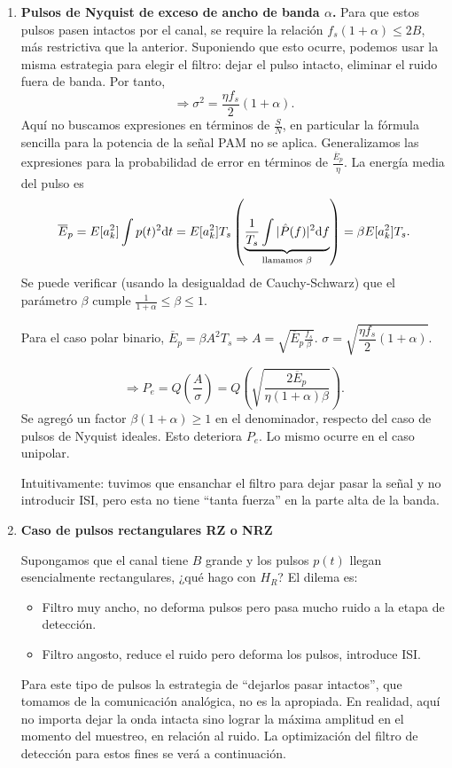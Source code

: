 \begin{enumerate}
\newpage


    \item \textbf{Pulsos de Nyquist de exceso de ancho de banda $\alpha$.}
    \label{item:2}
    Para que estos pulsos pasen intactos por el canal, se require
    la relación $f_s (1+\alpha) \leq 2B$, más restrictiva que la
    anterior. Suponiendo que esto ocurre, podemos usar la misma
    estrategia para elegir el filtro: dejar el pulso intacto,
    eliminar el ruido fuera de banda. Por tanto,
 \[
\Rightarrow \sigma^2 = \frac{\eta f_s}{2}(1+\alpha).
\]
Aquí no buscamos expresiones en términos de $\frac{S}{N}$, en
particular la fórmula sencilla para la potencia de la señal PAM
no se aplica. Generalizamos las expresiones para la probabilidad
de error en términos de $\frac{\overline{E}_p}{\eta}$. La energía
media del pulso es
    \[\overline{E}_p = E[a_k^2] \int p(t)^2\mathrm{d} t = E[a_k^2] T_s \left(\underbrace{\frac{1}{T_s}\int |\hat{P}(f)|^2\mathrm{d} f}_{\text{llamamos }\beta}\right)
     = \beta E[a_k^2] T_s.\]
    Se puede verificar (usando la desigualdad de Cauchy-Schwarz) que el parámetro $\beta$ cumple  $\frac{1}{1+\alpha} \leq \beta \leq
    1$.

    Para el caso polar binario, $\overline{E}_p = \beta A^2 T_s\Rightarrow A=\sqrt{\overline{E}_p \frac{f_s}{\beta}}$. $\sigma=\sqrt{\dfrac{\eta f_s}{2} (1+\alpha)}$.

    \[\Rightarrow P_e = Q\left(\frac{A}{\sigma}\right) = Q\left(\sqrt{\frac{2\overline{E}_p}{\eta (1+\alpha)\beta}}\right).\]
    Se agregó un factor $\beta(1+\alpha)\geq 1$ en el denominador,
    respecto del caso de pulsos de Nyquist ideales. Esto deteriora
    $P_e$. Lo mismo ocurre en el caso unipolar.

    Intuitivamente: tuvimos que ensanchar el filtro para dejar pasar la señal y no introducir ISI, pero esta no tiene ``tanta fuerza'' en la parte alta de la banda.

    \item \textbf{Caso de pulsos rectangulares RZ o NRZ}
    \label{item:3}

    Supongamos que el canal tiene $B$ grande y los pulsos $p(t)$ llegan esencialmente rectangulares, ¿qué hago con $H_R$? El dilema es:
    \begin{itemize}
        \item Filtro muy ancho, no deforma pulsos pero pasa mucho ruido a la etapa de
        detección.
        \item Filtro angosto, reduce el ruido pero deforma los pulsos, introduce ISI.
    \end{itemize}
    Para este tipo de pulsos la estrategia de ``dejarlos pasar intactos'', que tomamos de la comunicación analógica, no
    es la apropiada.
    En realidad, aquí no importa dejar la onda intacta sino lograr la máxima amplitud en el momento del
    muestreo, en relación al ruido. La optimización del filtro de
    detección para estos fines se verá a continuación.
\end{enumerate}
